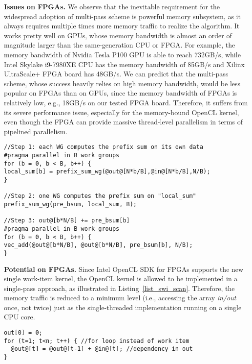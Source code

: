 {\bf Issues on FPGAs. }We observe that the inevitable requirement for the widespread adoption of multi-pass scheme is powerful memory subsystem, as it always requires multiple times more memory traffic to realize the algorithm. It works pretty well on GPUs, whose memory bandwidth is almost an order of magnitude larger than the same-generation CPU or FPGA. For example, the memory bandwidth of Nvidia Tesla P100 GPU is able to reach 732GB/s, while Intel Skylake i9-7980XE CPU has the memory bandwidth of 85GB/s and Xilinx UltraScale+ FPGA board has 48GB/s. We can predict that the multi-pass scheme, whose success heavily relies on high memory bandwidth, would be less popular on FPGAs than on GPUs, since the memory bandwidth of FPGAs is relatively low, e.g., 18GB/s on our tested FPGA board. Therefore, it suffers from its severe performance issue, especially for the memory-bound OpenCL kernel, even though the FPGA can provide massive thread-level parallelism in terms of pipelined parallelism. 
\begin{lstlisting}[caption={MPS-based prefix sum},label={list_parallel_scan},captionpos=b]
//Step 1: each WG computes the prefix sum on its own data
#pragma parallel in B work groups
for (b = 0, b < B, b++) { 
local_sum[b] = prefix_sum_wg(@out@[N*b/B],@in@[N*b/B],N/B);
}

//Step 2: one WG computes the prefix sum on "local_sum"
prefix_sum_wg(pre_bsum, local_sum, B);

//Step 3: out@[b*N/B] += pre_bsum[b]
#pragma parallel in B work groups
for (b = 0, b < B, b++) {
vec_add(@out@[b*N/B], @out@[b*N/B], pre_bsum[b], N/B);
}
\end{lstlisting}
{\bf Potential on FPGAs. } Since Intel OpenCL SDK for FPGAs supports the new single work-item kernel, the OpenCL kernel is allowed to be implemented in a single-pass approach, as illustrated in Listing~\ref{list_swi_scan}. %
Therefore, the memory traffic is reduced to a minimum level (i.e., accessing the array \emph{in/out} once, not twice) just as the single-threaded implementation running on a single CPU core. 
\begin{lstlisting}[caption={SWI-based prefix sum},label={list_swi_scan},captionpos=b]
out[0] = 0;
for (t=1; t<n; t++) { //for loop instead of work item
  @out@[t] = @out@[t-1] + @in@[t]; //dependency in out
}
\end{lstlisting}



